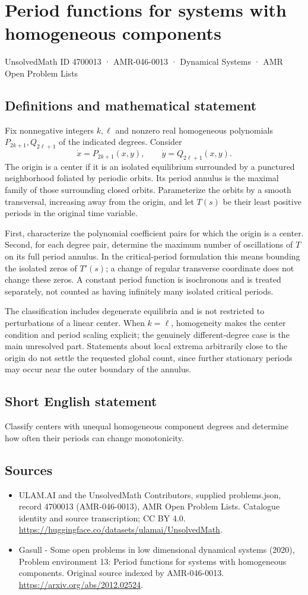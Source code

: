 \documentclass[11pt,a4paper]{article}
\begin{document}
\section*{Period functions for systems with homogeneous components}\label{4700013}
{\small UnsolvedMath ID 4700013 · AMR-046-0013 · Dynamical Systems · AMR Open Problem Lists}
\subsection{Definitions and mathematical statement}
Fix nonnegative integers $k,\ell$ and nonzero real homogeneous polynomials
$P_{2k+1},Q_{2\ell+1}$ of the indicated degrees. Consider
\[
 \dot x=P_{2k+1}(x,y),\qquad
 \dot y=Q_{2\ell+1}(x,y).
\]
The origin is a center if it is an isolated equilibrium surrounded by a
punctured neighborhood foliated by periodic orbits. Its period annulus is
the maximal family of those surrounding closed orbits. Parameterize the
orbits by a smooth transversal, increasing away from the origin, and let
$T(s)$ be their least positive periods in the original time variable.

First, characterize the polynomial coefficient pairs for which the origin
is a center. Second, for each degree pair, determine the maximum number of
oscillations of $T$ on its full period annulus. In the critical-period
formulation this means bounding the isolated zeros of $T'(s)$; a change of
regular transverse coordinate does not change these zeros. A constant
period function is isochronous and is treated separately, not counted as
having infinitely many isolated critical periods.

The classification includes degenerate equilibria and is not restricted to
perturbations of a linear center. When $k=\ell$, homogeneity makes the
center condition and period scaling explicit; the genuinely different-degree
case is the main unresolved part. Statements about local extrema arbitrarily
close to the origin do not settle the requested global count, since further
stationary periods may occur near the outer boundary of the annulus.
\subsection{Short English statement}
Classify centers with unequal homogeneous component degrees and determine how often their periods can change monotonicity.
\subsection{Sources}
\begin{itemize}
\item[S1] ULAM.AI and the UnsolvedMath Contributors, supplied problems.json, record 4700013 (AMR-046-0013), AMR Open Problem Lists. Catalogue identity and source transcription; CC BY 4.0.
\url{https://huggingface.co/datasets/ulamai/UnsolvedMath}.
\item[S2] Gasull - Some open problems in low dimensional dynamical systems (2020), Problem environment 13: Period functions for systems with homogeneous components. Original source indexed by AMR-046-0013.
\url{https://arxiv.org/abs/2012.02524}.
\end{itemize}
\end{document}
